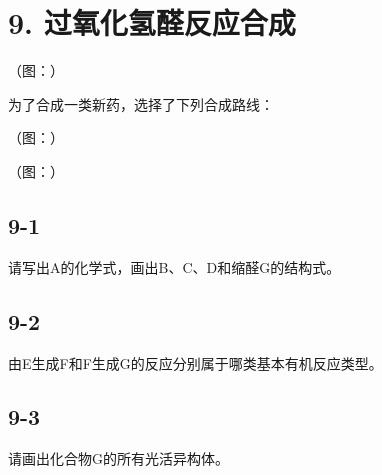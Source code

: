 \section*{9. 过氧化氢醛反应合成}
（图：）

为了合成⼀类新药，选择了下列合成路线：

（图：）

（图：）

\subsection*{9-1}
请写出A的化学式，画出B、C、D和缩醛G的结构式。

\subsection*{9-2}
由E⽣成F和F⽣成G的反应分别属于哪类基本有机反应类型。

\subsection*{9-3}
请画出化合物G的所有光活异构体。
